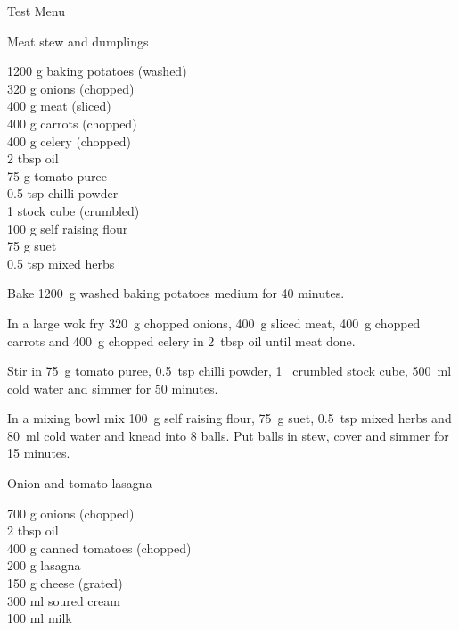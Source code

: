 \begin{menu}{Test Menu}
\begin{recipe}{2}{Meat stew and dumplings}
		\begin{ingredients}
		1200 g baking potatoes (washed) \\
	320 g onions (chopped) \\
	400 g meat (sliced) \\
	400 g carrots (chopped) \\
	400 g celery (chopped) \\
	2 tbsp oil  \\
	75 g tomato puree  \\
	0.5 tsp chilli powder  \\
	1  stock cube (crumbled) \\
	100 g self raising flour  \\
	75 g suet  \\
	0.5 tsp mixed herbs  \\
	
		\end{ingredients}
	
	
	
    \begin{instructions}
    \item 
      Bake 1200~g washed baking potatoes
      medium for 40 minutes.
    \item 
        In a large wok fry
        320~g chopped onions,
        400~g sliced meat,
        400~g chopped carrots
        and
        400~g chopped celery
        in
        2~tbsp  oil
        until meat done.
      \item 
        Stir in
        75~g  tomato puree,
        0.5~tsp  chilli powder,
        1~ crumbled stock cube,
        500~ml  cold water
        and simmer for 50 minutes.
      \item 
        In a mixing bowl mix
        100~g  self raising flour,
        75~g  suet,
        0.5~tsp  mixed herbs
        and
        80~ml  cold water
        and knead into 8 balls.
        Put balls in stew, cover and
        simmer for 15 minutes.
      
    \end{instructions}
    \end{recipe}%
  
    \begin{recipe}{2}{Onion and tomato lasagna}%
    
		\begin{ingredients}
		700 g onions (chopped) \\
	2 tbsp oil  \\
	400 g canned tomatoes (chopped) \\
	200 g lasagna  \\
	150 g cheese (grated) \\
	300 ml soured cream  \\
	100 ml milk  \\
	

\end{ingredients}
\end{recipe}
\end{menu}
